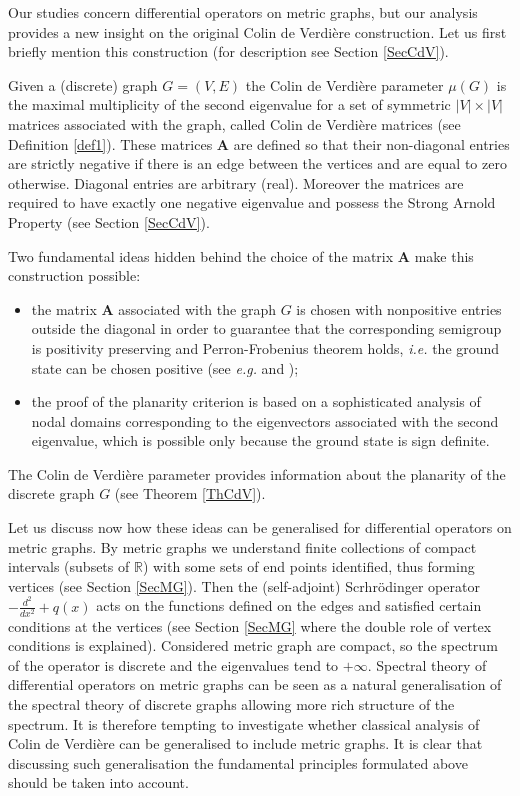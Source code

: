 \documentclass{amsart}
\theoremstyle{definition}
\theoremstyle{remark}
\numberwithin{equation}{section}
\begin{document}
Our studies concern differential operators on metric graphs, but our analysis provides a new insight
on the original Colin de Verdi\`ere construction. Let us first briefly mention this construction (for description see Section \ref{SecCdV}).

Given a (discrete) graph $ G =  (V,E) $ the Colin de Verdi\`ere parameter $\mu(G)$ is the maximal multiplicity of the second eigenvalue for a 
set of symmetric $|V| \times |V|$ matrices associated with the graph, called Colin de Verdi\`ere matrices (see Definition \ref{def1}). These matrices $\mathbf A$ are defined so
that their non-diagonal entries are strictly negative if there is an edge between the vertices and are equal to zero otherwise. Diagonal entries are arbitrary (real).
Moreover the matrices are required to have exactly one negative eigenvalue and possess the Strong Arnold Property (see Section \ref{SecCdV}).

Two fundamental ideas hidden behind the choice of the matrix $ \mathbf A $ make  this construction possible:
\begin{itemize}
\item the matrix $ \mathbf{A} $ associated with the graph $ G $ is chosen with nonpositive entries outside the diagonal 
in order to guarantee that the corresponding semigroup is positivity
preserving and Perron-Frobenius theorem holds, {\it i.e.} the ground state can be chosen positive  (see {\it e.g.} \cite{BerPle}
and \cite[Theorem 7.1]{Bat});
\item the proof of the planarity criterion is based on a sophisticated analysis of nodal domains corresponding to the eigenvectors associated with the second eigenvalue, which is possible only because the ground state is sign definite.
\end{itemize}


The Colin de Verdi\`ere parameter provides information about the planarity  of the discrete graph $G$ (see Theorem \ref{ThCdV}).





Let us discuss now how these ideas can be generalised for
differential operators on metric graphs.  
By metric graphs we understand finite collections of compact intervals (subsets of $ \mathbb R $)
with some sets of end points identified, thus forming vertices (see Section \ref{SecMG}).
Then the (self-adjoint)
Scrhr\"odinger operator $ - \frac{d^2}{dx^2} + q(x) $ acts on the functions defined on the edges
and satisfied certain conditions at the vertices
(see Section \ref{SecMG} where the double role of vertex conditions is explained).
Considered metric graph are compact, so the
spectrum of the operator is discrete and the eigenvalues tend to $ + \infty $.
Spectral theory of differential operators on
metric graphs can be seen as a natural generalisation of the spectral theory of discrete graphs allowing 
more rich structure of the spectrum.
 It is therefore tempting to investigate whether classical analysis of
Colin de Verdi\`ere can be  generalised to include metric graphs. 
It is clear that discussing such generalisation the
fundamental principles formulated above should be taken into account. 
\end{document}
